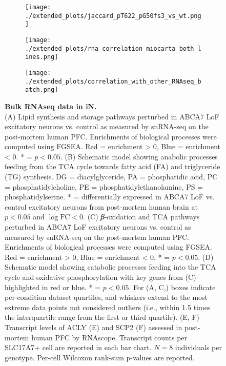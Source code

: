 \begin{figure}[ht]
    \begin{subfigure}[t]{.3\textwidth}
        \caption{}
        \texttt{[image: ./extended\_plots/jaccard\_pT622\_pG50fs3\_vs\_wt.png]}        
    \end{subfigure}
    \begin{subfigure}[t]{.3\textwidth}
        \caption{}
        \texttt{[image: ./extended\_plots/rna\_correlation\_miocarta\_both\_lines.png]}        
    \end{subfigure}
    \begin{subfigure}[t]{.3\textwidth}
        \caption{}
        \texttt{[image: ./extended\_plots/correlation\_with\_other\_RNAseq\_batch.png]}        
    \end{subfigure}
    \caption{
        \textbf{Bulk RNAseq data in iN.}\\[1ex]
        (A) Lipid synthesis and storage pathways perturbed in ABCA7 LoF excitatory neurons vs. control as measured by snRNA-seq on the post-mortem human PFC. Enrichments of biological processes were computed using FGSEA. Red = enrichment > 0, Blue = enrichment < 0. * = $p<0.05$. 
        (B) Schematic model showing anabolic processes feeding from the TCA cycle towards fatty acid (FA) and triglyceride (TG) synthesis. DG = diacylglyceride, PA = phosphatidic acid, PC = phosphatidylcholine, PE = phosphatidylethanolamine, PS = phosphatidylserine. * = differentially expressed in ABCA7 LoF vs. control excitatory neurons from post-mortem human brain at $p<0.05$ and $\log\text{FC}<0$. 
        (C) 𝛽-oxidation and TCA pathways perturbed in ABCA7 LoF excitatory neurons vs. control as measured by snRNA-seq on the post-mortem human PFC. Enrichments of biological processes were computed using FGSEA. Red = enrichment > 0, Blue = enrichment < 0. * = $p<0.05$. 
        (D) Schematic model showing catabolic processes feeding into the TCA cycle and oxidative phosphorylation with key genes from (C) highlighted in red or blue. * = $p<0.05$. For (A, C,) boxes indicate per-condition dataset quartiles, and whiskers extend to the most extreme data points not considered outliers (i.e., within 1.5 times the interquartile range from the first or third quartile). 
        (E, F) Transcript levels of ACLY (E) and SCP2 (F) assessed in post-mortem human PFC by RNAscope. Transcript counts per SLC17A7+ cell are reported in each bar chart. $N = 8$ individuals per genotype. Per-cell Wilcoxon rank-sum p-values are reported.
    }
    \label{fig:bulk_RNAseq_supplement}
\end{figure}